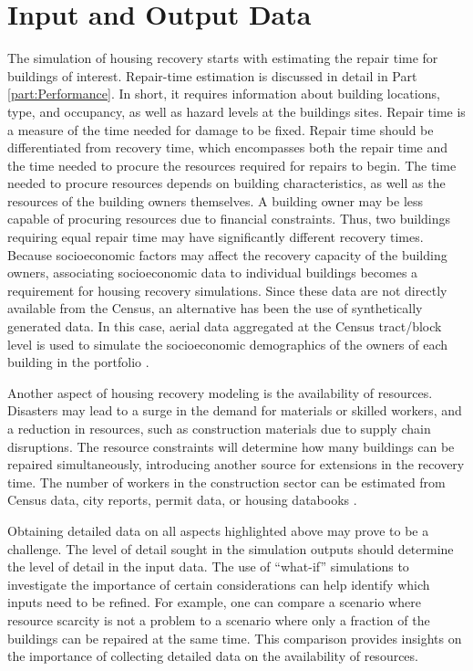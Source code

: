 \section{Input and Output Data} 
The simulation of housing recovery starts with estimating the repair time for buildings of interest. Repair-time estimation is discussed in detail in Part \ref{part:Performance}. In short, it requires information about building locations, type, and occupancy, as well as hazard levels at the buildings sites. Repair time is a measure of the time needed for damage to be fixed. Repair time should be differentiated from recovery time, which encompasses both the repair time and the time needed to procure the resources required for repairs to begin. The time needed to procure resources depends on building characteristics, as well as the resources of the building owners themselves. A building owner may be less capable of procuring resources due to financial constraints. Thus, two buildings requiring equal repair time may have significantly different recovery times. Because socioeconomic factors may affect the recovery capacity of the building owners, associating socioeconomic data to individual buildings becomes a requirement for housing recovery simulations. Since these data are not directly available from the Census, an alternative has been the use of synthetically generated data. In this case, aerial data aggregated at the Census tract/block level is used to simulate the socioeconomic demographics of the owners of each building in the portfolio \citep{rosenheim2019integration}. \ 

Another aspect of housing recovery modeling is the availability of resources. Disasters may lead to a surge in the demand for materials or skilled workers, and a reduction in resources, such as construction materials due to supply chain disruptions. The resource constraints will determine how many buildings can be repaired simultaneously, introducing another source for extensions in the recovery time. The number of workers in the construction sector can be estimated from Census data, city reports, permit data, or housing databooks \citep{kang2018replicating, costa2020housing}. \

Obtaining detailed data on all aspects highlighted above may prove to be a challenge. The level of detail sought in the simulation outputs should determine the level of detail in the input data. The use of ``what-if'' simulations to investigate the importance of certain considerations can help identify which inputs need to be refined. For example, one can compare a scenario where resource scarcity is not a problem to a scenario where only a fraction of the buildings can be repaired at the same time. This comparison provides insights on the importance of collecting detailed data on the availability of resources.\ 

